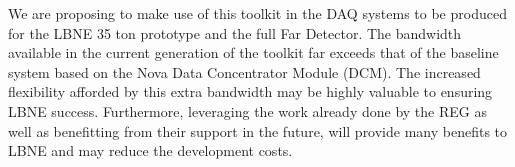We are proposing to make use of this toolkit in the DAQ systems to be produced
for the LBNE 35 ton prototype and the full Far Detector.
The bandwidth available in the current generation of the toolkit far
exceeds that of the baseline system based on the Nova Data Concentrator 
Module (DCM).
The increased flexibility afforded by this extra bandwidth may be highly valuable to 
ensuring LBNE success.
Furthermore, leveraging the work already done by the REG as well as benefitting from
their support in the future, will provide many benefits to LBNE and may reduce
the development costs.